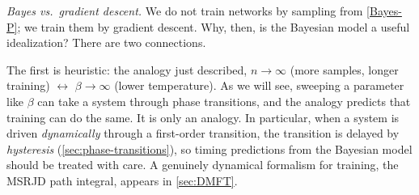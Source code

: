 \documentclass[11pt]{article}
\begin{document}
\emph{Bayes vs.\ gradient descent.} We do not train networks by sampling from \eqref{Bayes-P}; we train them by gradient descent. Why, then, is the Bayesian model a useful idealization? There are two connections.

The first is heuristic: the analogy just described, $n\to\infty$ (more samples, longer training) $\leftrightarrow$ $\beta\to\infty$ (lower temperature). As we will see, sweeping a parameter like $\beta$ can take a system through phase transitions, and the analogy predicts that training can do the same. It is only an analogy. In particular, when a system is driven \emph{dynamically} through a first-order transition, the transition is delayed by \emph{hysteresis} (\cref{sec:phase-transitions}), so timing predictions from the Bayesian model should be treated with care. A genuinely dynamical formalism for training, the MSRJD path integral, appears in \cref{sec:DMFT}.
\end{document}
